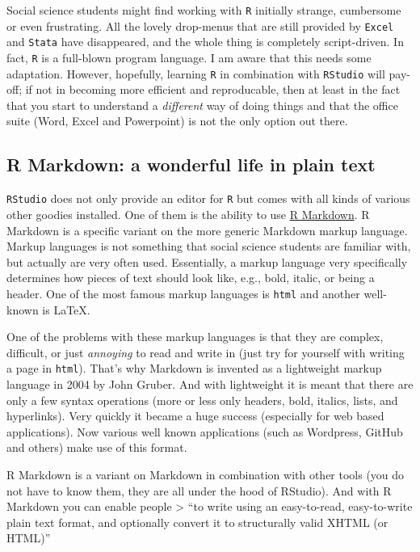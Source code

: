 \documentclass[]{article}
\theoremstyle{definition}
\theoremstyle{definition}
\theoremstyle{definition}
\theoremstyle{remark}
\begin{document}
Social science students might find working with \texttt{R} initially
strange, cumbersome or even frustrating. All the lovely drop-menus that
are still provided by \texttt{Excel} and \texttt{Stata} have
disappeared, and the whole thing is completely script-driven. In fact,
\texttt{R} is a full-blown program language. I am aware that this needs
some adaptation. However, hopefully, learning \texttt{R} in combination
with \texttt{RStudio} will pay-off; if not in becoming more efficient
and reproducable, then at least in the fact that you start to understand
a \emph{different} way of doing things and that the office suite (Word,
Excel and Powerpoint) is not the only option out there.

\subsection{R Markdown: a wonderful life in plain
text}\label{r-markdown-a-wonderful-life-in-plain-text}

\texttt{RStudio} does not only provide an editor for \texttt{R} but
comes with all kinds of various other goodies installed. One of them is
the ability to use \href{http://rmarkdown.rstudio.com/}{R Markdown}. R
Markdown is a specific variant on the more generic Markdown markup
language. Markup languages is not something that social science students
are familiar with, but actually are very often used. Essentially, a
markup language very specifically determines how pieces of text should
look like, e.g., bold, italic, or being a header. One of the most famous
markup languages is \texttt{html} and another well-known is LaTeX.

One of the problems with these markup languages is that they are
complex, difficult, or just \emph{annoying} to read and write in (just
try for yourself with writing a page in \texttt{html}). That's why
Markdown is invented as a lightweight markup language in 2004 by John
Gruber. And with lightweight it is meant that there are only a few
syntax operations (more or less only headers, bold, italics, lists, and
hyperlinks). Very quickly it became a huge success (especially for web
based applications). Now various well known applications (such as
Wordpress, GitHub and others) make use of this format.

R Markdown is a variant on Markdown in combination with other tools (you
do not have to know them, they are all under the hood of RStudio). And
with R Markdown you can enable people \textgreater{} ``to write using an
easy-to-read, easy-to-write plain text format, and optionally convert it
to structurally valid XHTML (or HTML)''
\end{document}
